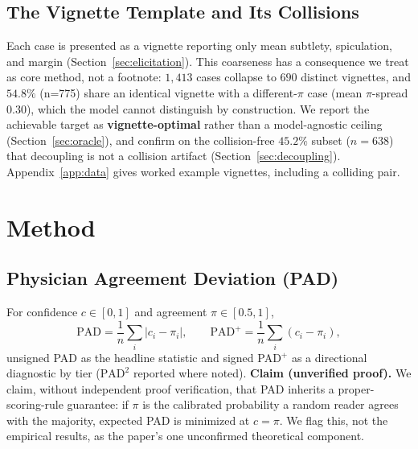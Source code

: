 \documentclass[letterpaper]{article} %
\begin{document}
\subsection{The Vignette Template and Its Collisions}
\label{sec:collision}
Each case is presented as a vignette reporting only mean subtlety,
spiculation, and margin (Section~\ref{sec:elicitation}). This coarseness has
a consequence we treat as core method, not a footnote: $1{,}413$ cases
collapse to $690$ distinct vignettes, and $\mathbf{54.8\%}$ (n=775) share an
identical vignette with a different-$\pi$ case (mean $\pi$-spread $0.30$),
which the model cannot distinguish by construction. We report the achievable
target as \textbf{vignette-optimal} rather than a model-agnostic ceiling
(Section~\ref{sec:oracle}), and confirm on the collision-free $45.2\%$
subset ($n{=}638$) that decoupling is not a collision artifact
(Section~\ref{sec:decoupling}). Appendix~\ref{app:data} gives worked example
vignettes, including a colliding pair.

\section{Method}

\subsection{Physician Agreement Deviation (PAD)}
\label{sec:pad}
For confidence $c \in [0,1]$ and agreement $\pi \in [0.5,1]$,
\[
\mathrm{PAD} = \frac{1}{n}\textstyle\sum_i |c_i - \pi_i|, \qquad
\mathrm{PAD}^+ = \frac{1}{n}\textstyle\sum_i (c_i - \pi_i),
\]
unsigned PAD as the headline statistic and signed PAD$^+$ as a directional
diagnostic by tier ($\mathrm{PAD}^2$ reported where noted). \textbf{Claim
(unverified proof).} We claim, without independent proof verification, that
PAD inherits a proper-scoring-rule guarantee: if $\pi$ is the calibrated
probability a random reader agrees with the majority, expected PAD is
minimized at $c=\pi$. We flag this, not the empirical results, as the
paper's one unconfirmed theoretical component.
\end{document}
